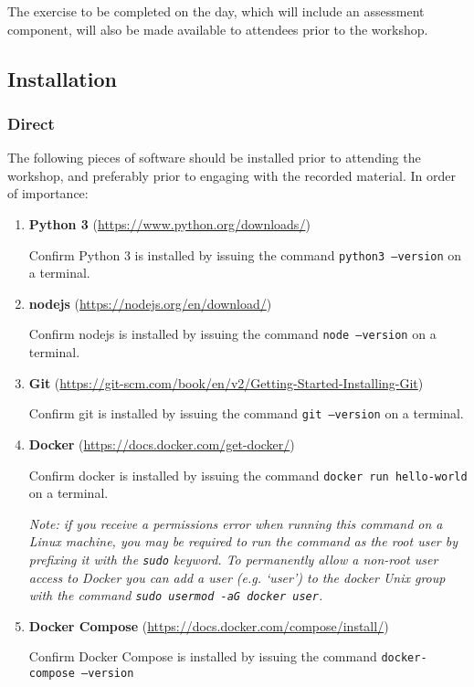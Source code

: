 \documentclass{article}
\begin{document}
The exercise to be completed on the day, which will include an assessment component, will also be made available to attendees prior to the workshop.

\subsection{Installation}

\subsubsection{Direct}

The following pieces of software should be installed prior to attending the workshop, and preferably prior to engaging with the recorded material. 
In order of importance:

\begin{enumerate}

    \item \textbf{Python 3}
    (\href{https://www.python.org/downloads/}{https://www.python.org/downloads/})

    Confirm Python 3 is installed by issuing the command
    \texttt{python3 --version} on a terminal.

    \item \textbf{nodejs}
    (\href{https://nodejs.org/en/download/}{https://nodejs.org/en/download/})

    Confirm nodejs is installed by issuing the command
    \texttt{node --version} on a terminal.

    \item \textbf{Git}
    (\href{https://git-scm.com/book/en/v2/Getting-Started-Installing-Git}{https://git-scm.com/book/en/v2/Getting-Started-Installing-Git})

    Confirm git is installed by issuing the command
    \texttt{git --version} on a terminal.

    \item \textbf{Docker}
    (\href{https://docs.docker.com/get-docker/}{https://docs.docker.com/get-docker/})

    Confirm docker is installed by issuing the command
    \texttt{docker run hello-world} on a terminal.

    \emph{Note: if you receive a permissions error when running this command on a Linux machine, you may be required to run the command as the root user by prefixing it with the \texttt{sudo} keyword. To permanently allow a non-root user access to Docker you can add a user (e.g. `user') to the docker Unix group with the command \texttt{sudo usermod -aG docker user}.}

    \item \textbf{Docker Compose}
    (\href{https://docs.docker.com/compose/install/}{https://docs.docker.com/compose/install/})

    Confirm Docker Compose is installed by issuing the command \newline
    \texttt{docker-compose --version}

\end{enumerate}
\end{document}

